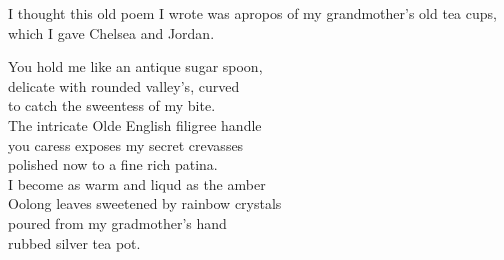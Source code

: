 I thought this old poem I wrote was apropos of my grandmother's old tea cups, which I gave Chelsea and Jordan.

\bigskip
{\centering
    You hold me like an antique sugar spoon,\\
    delicate with rounded valley's, curved\\
    to catch the sweentess of my bite.\\
    The intricate Olde English filigree handle\\
    you caress exposes my secret crevasses\\
    polished now to a fine rich patina.\\
    I become as warm and liqud as the amber\\
    Oolong leaves sweetened by rainbow crystals\\
    poured from my gradmother's hand\\
    rubbed silver tea pot.\\
}
